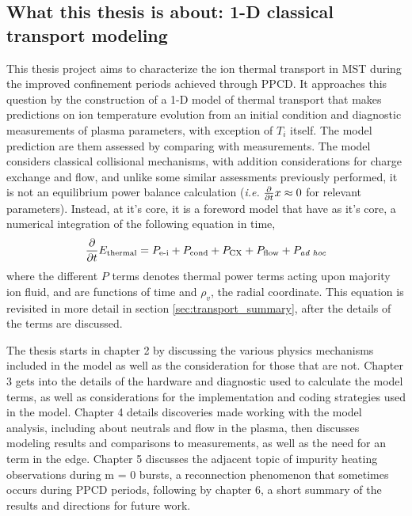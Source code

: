 \begin{refsection}
\section{What this thesis is about: 1-D classical transport modeling}

This thesis project aims to characterize the ion thermal transport in MST during the improved confinement periods achieved through PPCD. It approaches this question by the construction of a 1-D model of thermal transport that makes predictions on ion temperature evolution from an initial condition and diagnostic measurements of plasma parameters, with exception of $T_i$ itself. The model prediction are them assessed by comparing with measurements. The model considers classical collisional mechanisms, with addition considerations for charge exchange and flow, and unlike some similar assessments previously performed, it is not an equilibrium power balance calculation (\textit{i.e.} $\frac{\partial}{\partial t} x \approx 0$ for relevant parameters). Instead, at it's core, it is a foreword model that have as it's core, a numerical integration of the following equation in time,
\begin{align}
    \frac{\partial}{\partial t} E_\text{thermal} = P_\text{e-i} + P_\text{cond} + P_\text{CX} + P_\text{flow} + P_\textit{ad hoc}
\end{align}
where the different $P$ terms denotes thermal power terms acting upon majority ion fluid, and are functions of time and $\rho_v$, the radial coordinate. This equation is revisited in more detail in section \ref{sec:transport_summary}, after the details of the terms are discussed. 

The thesis starts in chapter 2 by discussing the various physics mechanisms included in the model as well as the consideration for those that are not. Chapter 3 gets into the details of the hardware and diagnostic used to calculate the model terms, as well as considerations for the implementation and coding strategies used in the model. Chapter 4 details discoveries made working with the model analysis, including about neutrals and flow in the plasma, then discusses modeling results and comparisons to measurements, as well as the need for an \adhoc term in the edge. Chapter 5 discusses the adjacent topic of impurity heating observations during m = 0 bursts, a reconnection phenomenon that sometimes occurs during PPCD periods, following by chapter 6, a short summary of the results and directions for future work.


\end{refsection}
